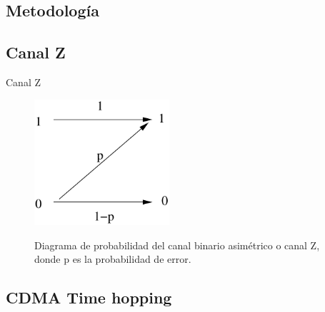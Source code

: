 \documentclass[aspectratio=169]{beamer}
\begin{document}

\subsection{Metodología}

\subsection{Canal Z}

\begin{frame}{Canal Z}
\begin{figure}[t]
  \centering
    \includegraphics[width=5cm]{../graphs/zchannel.pdf}
    
    Diagrama de probabilidad del canal binario asimétrico o canal Z, donde p es la probabilidad de error.
\end{figure}
\end{frame}

\subsection{CDMA Time hopping}
\end{document}
